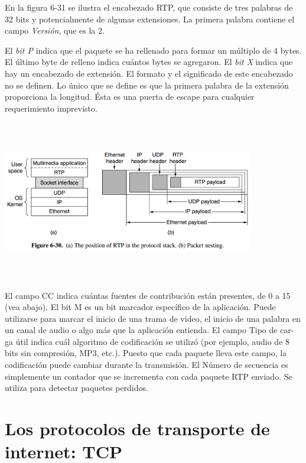 \documentclass[10pt,a4paper]{report}
\begin{document}
	\par En la figura 6-31 se ilustra el encabezado RTP, que consiste de tres palabras de 32 bits y potencialmente de algunas extensiones. La primera palabra contiene el campo \textit{Versión}, que es la 2.

	\par El \textit{bit P} indica que el paquete se ha rellenado para formar un múltiplo de 4 bytes. El último byte de relleno indica cuántos bytes se agregaron. El \textit{bit X} indica que hay un encabezado de extensión. El formato y el significado de este encabezado no se definen. Lo único que se define es que la primera palabra de la extensión proporciona la longitud. Ésta es una puerta de escape para cualquier requerimiento imprevisto.

	\begin{center}
		\includegraphics[width=11cm, height=7cm]{./imagenes/tiemporeal.png} 
	\end{center}

	\par El campo CC indica cuántas fuentes de contribución están presentes, de 0 a 15 (vea abajo). El bit M es un bit marcador específico de la aplicación. Puede utilizarse para marcar el inicio de una trama de video, el inicio de una palabra en un canal de audio o algo más que la aplicación entienda. El campo Tipo de car- ga útil indica cuál algoritmo de codificación se utilizó (por ejemplo, audio de 8 bits sin compresión, MP3, etc.). Puesto que cada paquete lleva este campo, la codificación puede cambiar durante la transmisión. El Número de secuencia es simplemente un contador que se incrementa con cada paquete RTP enviado. Se utiliza para detectar paquetes perdidos.
	
	
	
	
	
\section{Los protocolos de transporte de internet: TCP}
\end{document}
